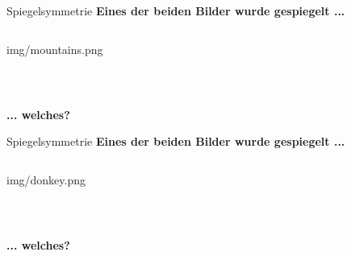 \begin{frame}{Spiegelsymmetrie}
    \centering
    \textbf{Eines der beiden Bilder wurde gespiegelt ...}
    \vspace*{.5cm}

	\begin{columns}[T]
		\begin{column}{.5\textwidth}
			\centering
			\begin{overpic}[width=\textwidth]{img/mountains.png}
			\end{overpic}\\
		\end{column}
		\begin{column}{.5\textwidth}
			\centering
            \\
		\end{column}
	\end{columns}
    \hfill \textbf{... welches?}
\end{frame}

\begin{frame}{Spiegelsymmetrie}
    \centering
    \textbf{Eines der beiden Bilder wurde gespiegelt ...}
    \vspace*{.5cm}

	\begin{columns}[T]
		\begin{column}{.5\textwidth}
			\centering
			\begin{overpic}[width=\textwidth]{img/donkey.png}
			\end{overpic}\\
		\end{column}
		\begin{column}{.5\textwidth}
			\centering
            \\
		\end{column}
	\end{columns}
    \hfill \textbf{... welches?}
\end{frame}

